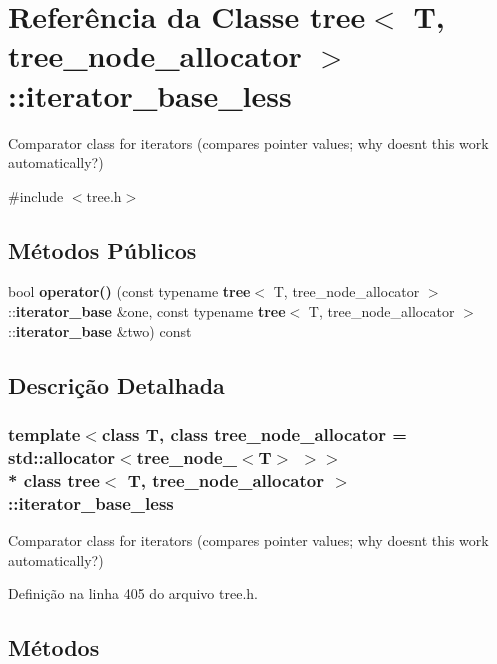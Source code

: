 \section{Referência da Classe tree$<$ T, tree\+\_\+node\+\_\+allocator $>$\+:\+:iterator\+\_\+base\+\_\+less}
\label{classtree_1_1iterator__base__less}


Comparator class for iterators (compares pointer values; why doesn\textquotesingle{}t this work automatically?)  




{\ttfamily \#include $<$tree.\+h$>$}

\subsection*{Métodos Públicos}
\begin{DoxyCompactItemize}
\item 
bool {\bf operator()} (const typename {\bf tree}$<$ T, tree\+\_\+node\+\_\+allocator $>$\+::{\bf iterator\+\_\+base} \&one, const typename {\bf tree}$<$ T, tree\+\_\+node\+\_\+allocator $>$\+::{\bf iterator\+\_\+base} \&two) const 
\end{DoxyCompactItemize}


\subsection{Descrição Detalhada}
\subsubsection*{template$<$class T, class tree\+\_\+node\+\_\+allocator = std\+::allocator$<$tree\+\_\+node\+\_\+$<$\+T$>$ $>$$>$\\*
class tree$<$ T, tree\+\_\+node\+\_\+allocator $>$\+::iterator\+\_\+base\+\_\+less}

Comparator class for iterators (compares pointer values; why doesn\textquotesingle{}t this work automatically?) 

Definição na linha 405 do arquivo tree.\+h.



\subsection{Métodos}
